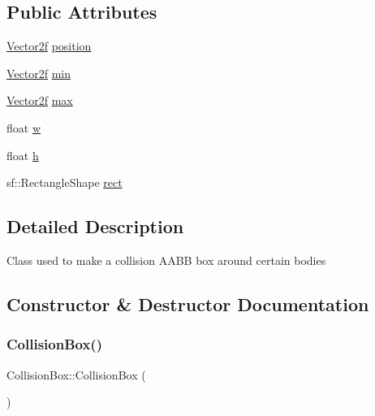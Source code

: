 \subsection*{Public Attributes}
\begin{DoxyCompactItemize}
\item 
\mbox{\hyperlink{class_vector2f}{Vector2f}} \mbox{\hyperlink{class_collision_box_aa2540a955bf4b7cefed5ec60b6e68b83}{position}}
\item 
\mbox{\hyperlink{class_vector2f}{Vector2f}} \mbox{\hyperlink{class_collision_box_a0eda20217315eb03da92ddb623dad972}{min}}
\item 
\mbox{\hyperlink{class_vector2f}{Vector2f}} \mbox{\hyperlink{class_collision_box_a46eadd8277c3ed86e7651a359a2cbefa}{max}}
\item 
float \mbox{\hyperlink{class_collision_box_ac04317c3ca9bc133a784f414066e569c}{w}}
\item 
float \mbox{\hyperlink{class_collision_box_ab46fbe0c72f6c67074798ec6c926bd6a}{h}}
\item 
sf\+::\+Rectangle\+Shape \mbox{\hyperlink{class_collision_box_ad4578e9be636b6642146dd8c89f0f0fc}{rect}}
\end{DoxyCompactItemize}


\subsection{Detailed Description}
Class used to make a collision A\+A\+BB box around certain bodies 

\subsection{Constructor \& Destructor Documentation}
\mbox{\label{class_collision_box_a11e887724dd21a42caa87411018de342}} 
\subsubsection{\texorpdfstring{CollisionBox()}{CollisionBox()}\hspace{0.1cm}{\footnotesize\ttfamily [1/2]}}
{\footnotesize\ttfamily Collision\+Box\+::\+Collision\+Box (\begin{DoxyParamCaption}{ }\end{DoxyParamCaption})}


